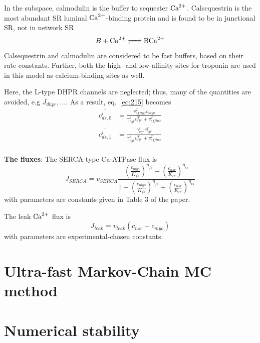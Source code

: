 In the subspace, calmodulin is the buffer to sequester
${\text{Ca}^{2+}}$. Calsequestrin is the most abundant SR luminal ${\text{Ca}^{2+}}$-binding
protein and is found to be in junctional SR, not in network
SR\citep{jafri1998cad}
\begin{equation}
  \label{eq:245}
  B + \ce{Ca^2+ <=> BCa^2+}
\end{equation}
Calsequestrin and calmodulin are considered to be fast buffers, based
on their rate constants. Further, both the high- and low-affinity
sites for troponin are used in this model as calcium-binding sites as
well.

Here, the L-type DHPR channels are neglected; thus, many of the
quantities are avoided, e.g $J_{dhpr}, ...$. As a result,
eq.~\eqref{eq:215} becomes
\begin{equation}
  \label{eq:246}
  \begin{split}
    \overline{c^i_{ds,0}} &= \frac{
      v^T_{efflux}c_{myo}}{\gamma^i_{ryr} v^T_{ryr} + v^T_{efflux}} \\
    \overline{c^i_{ds,1}} &=
    \frac{\gamma^i_{ryr}v^T_{ryr}}{\gamma^i_{ryr} v^T_{ryr} + v^T_{efflux}
    } \\
  \end{split}
\end{equation}


{\bf The fluxes}:
The SERCA-type Ca-ATPase flux is
\begin{equation}
  \label{eq:1900}
  J_{SERCA} = v_{SERCA} \frac{\left( \frac{c_{myo}}{K_{fs}}
    \right)^{\eta_{fs}} - \left( \frac{c_{nsr}}{K_{rs}}
    \right)^{\eta_{rs}}} {1 + \left( \frac{c_{myo}}{K_{fs}}
    \right)^{\eta_{fs}} + \left( \frac{c_{nsr}}{K_{rs}} \right)^{\eta_{rs}}}
\end{equation}
with parameters are constants given in Table 3 of the paper.

The leak ${\text{Ca}^{2+}}$ flux is
\begin{equation}
  \label{eq:1910}
  J_{leak} = v_{leak} (c_{nsr}-c_{myo})
\end{equation}
with parameters are experimental-chosen constants.


\section{Ultra-fast Markov-Chain MC method}
\label{sec:ultra-fast-markov}


\section{Numerical stability}
\label{sec:numerical-stability}

